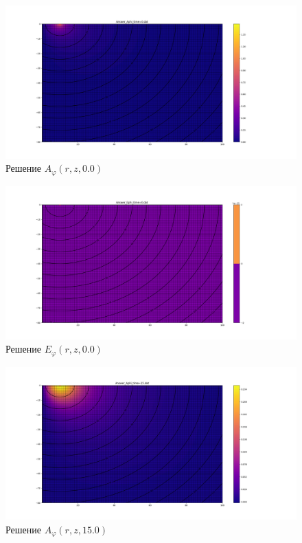 \begin{figure}
	\centering
	\includegraphics[width=0.9\linewidth]{images/Answer_Aphi_time=0.png}
	\caption{Решение $A_{\varphi}(r, z, 0.0)$}
	\label{fig:A_phi_0}
\end{figure}

\begin{figure}
	\centering
	\includegraphics[width=0.9\linewidth]{images/Answer_Ephi_time=0.png}
	\caption{Решение $E_{\varphi}(r, z, 0.0)$}
	\label{fig:E_phi_0}
\end{figure}

\begin{figure}
	\centering
	\includegraphics[width=1.0\linewidth]{images/Answer_Aphi_time=15.png}
	\caption{Решение $A_{\varphi}(r, z, 15.0)$}
	\label{fig:A_phi_15}
\end{figure}


